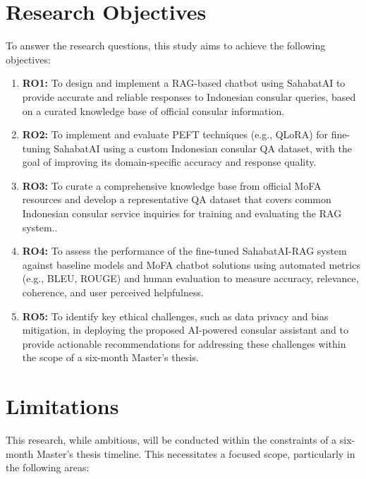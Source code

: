 \documentclass[12pt]{report}
\begin{document}
\section{Research Objectives}

To answer the research questions, this study aims to achieve the following objectives:

\begin{enumerate}
    \item \textbf{RO1:} To design and implement a RAG-based chatbot using SahabatAI to provide accurate and reliable responses to Indonesian consular queries, based on a curated knowledge base of official consular information.
    \item \textbf{RO2:} To implement and evaluate PEFT techniques (e.g., QLoRA) for fine-tuning SahabatAI using a custom Indonesian consular QA dataset, with the goal of improving its domain-specific accuracy and response quality.
    \item \textbf{RO3:} To curate a comprehensive knowledge base from official MoFA resources and develop a representative QA dataset that covers common Indonesian consular service inquiries for training and evaluating the RAG system..
    \item \textbf{RO4:} To assess the performance of the fine-tuned SahabatAI-RAG system against baseline models and MoFA chatbot solutions using automated metrics (e.g., BLEU, ROUGE) and human evaluation to measure accuracy, relevance, coherence, and user perceived helpfulness.
    \item \textbf{RO5:} To identify key ethical challenges, such as data privacy and bias mitigation, in deploying the proposed AI-powered consular assistant and to provide actionable recommendations for addressing these challenges within the scope of a six-month Master's thesis.
\end{enumerate}

\section{Limitations}

This research, while ambitious, will be conducted within the constraints of a six-month Master's thesis timeline. This necessitates a focused scope, particularly in the following areas:
\end{document}
